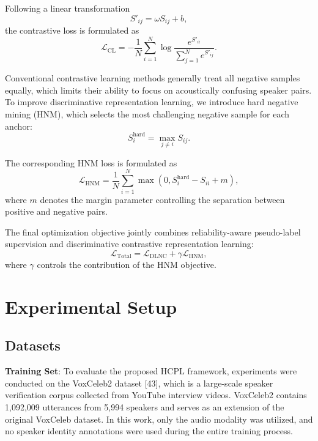 \documentclass[lettersize,journal]{IEEEtran}
\begin{document}
Following a linear transformation
\begin{equation}
S'_{ij}
=
\omega S_{ij}+b,
\end{equation}
the contrastive loss is formulated as
\begin{equation}
\mathcal{L}_{\mathrm{CL}}
=
-\frac{1}{N}
\sum_{i=1}^{N}
\log
\frac{
e^{S'_{ii}}
}{
\sum_{j=1}^{N}e^{S'_{ij}}
}.
\end{equation}

Conventional contrastive learning methods generally treat all negative samples equally, which limits their ability to focus on acoustically confusing speaker pairs. To improve discriminative representation learning, we introduce hard negative mining (HNM), which selects the most challenging negative sample for each anchor:
\begin{equation}
S_i^{\mathrm{hard}}
=
\max_{j\neq i}
S_{ij}.
\end{equation}

The corresponding HNM loss is formulated as
\begin{equation}
\mathcal{L}_{\mathrm{HNM}}
=
\frac{1}{N}
\sum_{i=1}^{N}
\max
\left(
0,
S_i^{\mathrm{hard}}
-
S_{ii}
+
m
\right),
\end{equation}
where $m$ denotes the margin parameter controlling the separation between positive and negative pairs.

The final optimization objective jointly combines reliability-aware pseudo-label supervision and discriminative contrastive representation learning:
\begin{equation}
\mathcal{L}_{\mathrm{Total}}
=
\mathcal{L}_{\mathrm{DLNC}}
+
\gamma
\mathcal{L}_{\mathrm{HNM}},
\end{equation}
where $\gamma$ controls the contribution of the HNM objective.

\section{Experimental Setup}

\subsection{Datasets}

\textbf{Training Set}: 
To evaluate the proposed HCPL framework, experiments were conducted on the VoxCeleb2 dataset [43], which is a large-scale speaker verification corpus collected from YouTube interview videos. VoxCeleb2 contains 1,092,009 utterances from 5,994 speakers and serves as an extension of the original VoxCeleb dataset. In this work, only the audio modality was utilized, and no speaker identity annotations were used during the entire training process.
\end{document}
